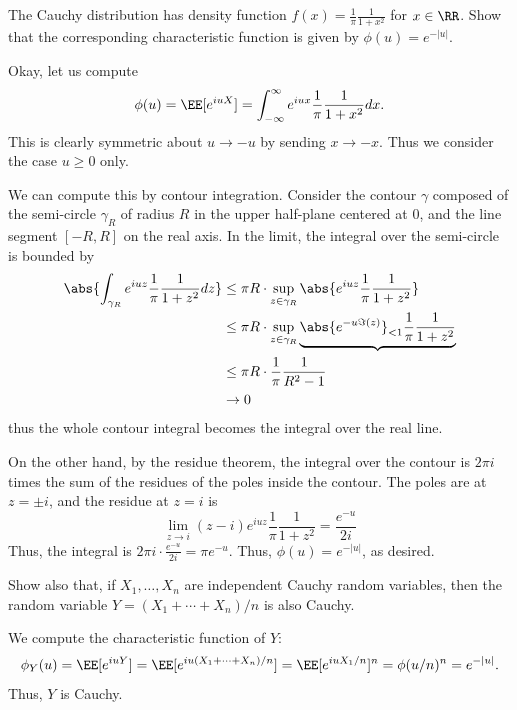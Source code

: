 \documentclass[11pt, headheight=30pt]{scrartcl}
\begin{document}
\section{}
\begin{prob}
    The Cauchy distribution has density function $f(x) = \frac{1}{\pi} \frac{1}{1 + x^2}$ for $x \in \RR$.
    Show that the corresponding characteristic function is given by $\phi(u) = e^{-|u|}$.
\end{prob}

Okay, let us compute
\[
    \phi(u) = \EE[e^{iuX}] = \int_{-\infty}^\infty e^{iux} \frac{1}{\pi} \frac{1}{1 + x^2} dx.
\]
This is clearly symmetric about $u\to -u$ by sending $x\to -x$. Thus we
consider the case $u \geq 0$ only.

We can compute this by contour integration. Consider the contour $\gamma$
composed of the semi-circle $\gamma_R$ of radius $R$ in the upper half-plane
centered at $0$, and the line segment $[-R, R]$ on the real axis. In the limit,
the integral over the semi-circle is bounded by
\begin{align*}
    \abs{\int_{\gamma_R} e^{iuz} \frac{1}{\pi} \frac{1}{1 + z^2} dz}
    &\leq \pi R \cdot \sup_{z\in \gamma_R} \abs{e^{iuz}\frac{1}{\pi} \frac{1}{1 + z^2}}\\
    &\leq \pi R \cdot \sup_{z\in \gamma_R} \underbrace{\abs{e^{-u \Im(z)}}_{ < 1}\frac{1}{\pi} \frac{1}{1 + z^2}}\\
    &\leq \pi R \cdot \frac{1}{\pi} \frac{1}{R^2 - 1}\\
    &\to 0
\end{align*}
thus the whole contour integral becomes the integral over the real line.

On the other hand, by the residue theorem, the integral over the contour
is $2\pi i$ times the sum of the residues of the poles inside the contour.
The poles are at $z = \pm i$, and the residue at $z = i$ is
\[
    \lim_{z\to i} (z - i) e^{iuz} \frac{1}{\pi} \frac{1}{1 + z^2} = \frac{e^{-u}}{2i}
\]
Thus, the integral is $2\pi i \cdot \frac{e^{-u}}{2i} = \pi e^{-u}$.
Thus, $\phi(u) = e^{-|u|}$, as desired.

\begin{prob}
    Show also that, if $X_1, \ldots, X_n$ are independent Cauchy random variables,
    then the random variable $Y = (X_1 + \cdots + X_n)/n$ is also Cauchy.
\end{prob}

We compute the characteristic function of $Y$:
\[
    \phi_Y(u) = \EE[e^{iuY}] = \EE[e^{iu(X_1 + \cdots + X_n)/n}] = \EE[e^{iuX_1/n}]^n = \phi(u/n)^n = e^{-|u|}.
\]
Thus, $Y$ is Cauchy.
\end{document}
